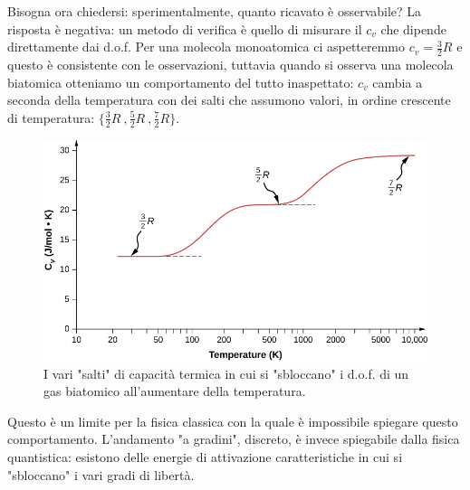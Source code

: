\documentclass[10pt,a4paper]{article}
\begin{document}
Bisogna ora chiedersi: sperimentalmente, quanto ricavato è osservabile? La risposta è negativa: un metodo di verifica è quello di misurare il $c_v$ che dipende direttamente dai d.o.f. Per una molecola monoatomica ci aspetteremmo $c_v = \frac{3}{2} R$ e questo è consistente con le osservazioni, tuttavia quando si osserva una molecola biatomica otteniamo un comportamento del tutto inaspettato: $c_v$ cambia a seconda della temperatura con dei salti che assumono valori, in ordine crescente di temperatura: $\{\frac{3}{2}R\ , \frac{5}{2}R\ ,\frac{7}{2}R\}$. 
\begin{figure}[h!]
	\centering
	\includegraphics[width=0.6\linewidth]{../images/c_su_T_biatomiche}
	\caption{I vari "salti" di capacità termica in cui si "sbloccano" i d.o.f. di un gas biatomico all'aumentare della temperatura.}
	\label{fig:csutbiatomiche}
\end{figure}
\FloatBarrier
Questo è un limite per la fisica classica con la quale è impossibile spiegare questo comportamento. L'andamento "a gradini", discreto, è invece spiegabile dalla fisica quantistica: esistono delle energie di attivazione caratteristiche in cui si "sbloccano" i vari gradi di libertà. 
\end{document}
